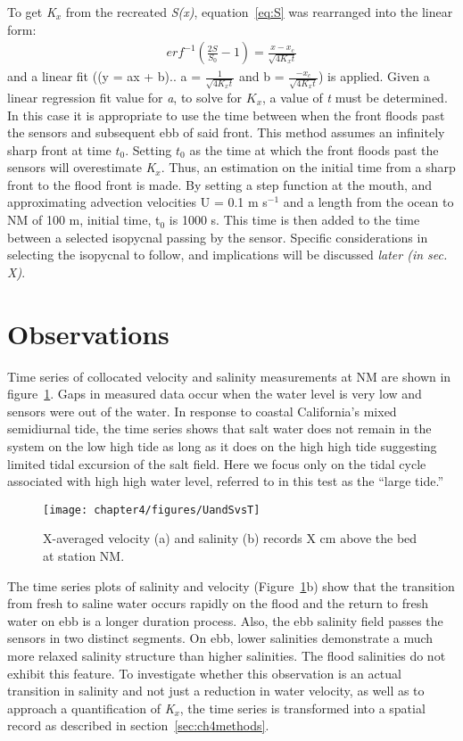To get \emph{K$_x$} from the recreated \emph{S(x)}, equation~\ref{eq:S} was rearranged into the linear form:
\begin{eqnarray}
erf^{-1}\left(\frac{2S}{S_0}-1\right) = \frac{x-x_c}{\sqrt{4K_xt}} \label{eq:linfitS}
\end{eqnarray}
and a linear fit ((y = ax + b).. a = $\frac{1}{\sqrt{4K_xt}}$ and b = $\frac{-x_c}{\sqrt{4K_xt}}$) is applied. Given a linear regression fit value for \emph{a}, to solve for $K_x$, a value of \emph{t} must be determined. In this case it is appropriate to use the time between when the front floods past the sensors and subsequent ebb of said front. This method assumes an infinitely sharp front at time $t_0$. Setting $t_0$ as the time at which the front floods past the sensors will overestimate \emph{K$_x$}. Thus, an estimation on the initial time from a sharp front to the flood front is made. By setting a step function at the mouth, and approximating advection velocities U = 0.1 m s$^{-1}$ and a length from the ocean to NM of 100 m, initial time, t$_0$ is 1000 s. This time is then added to the time between a selected isopycnal passing by the sensor. Specific considerations in selecting the isopycnal to follow, and implications will be discussed \emph{later (in sec. X)}. 



\section{Observations} \label{sec:ObsCh4}
Time series of collocated velocity and salinity measurements at NM are shown in figure~\ref{fig:UandSvsTch4}. Gaps in measured data occur when the water level is very low and sensors were out of the water. In response to coastal California's mixed semidiurnal tide, the time series shows that salt water does not remain in the system on the low high tide  as long as it does on the high high tide suggesting limited tidal excursion of the salt field. Here we focus only on the tidal cycle associated with high high water level, referred to in this test as the \textquotedblleft large tide.''

\begin{figure}[h]
	\texttt{[image: chapter4/figures/UandSvsT]} 
\caption{X-averaged velocity (a) and salinity (b) records X cm above the bed at station NM.} \label{fig:UandSvsTch4}
\end{figure}

The time series plots of salinity and velocity (Figure~\ref{fig:UandSvsTch4}b) show that the transition from fresh to saline water occurs rapidly on the flood and the return to fresh water on ebb is a longer duration process. Also, the ebb salinity field passes the sensors in two distinct segments. On ebb, lower salinities demonstrate a much more relaxed salinity structure than higher salinities. The flood salinities do not exhibit this feature. To investigate whether this observation is an actual transition in salinity and not just a reduction in water velocity, as well as to approach a quantification of \emph{K$_x$}, the time series is transformed into a spatial record as described in section~\ref{sec:ch4methods}. 

